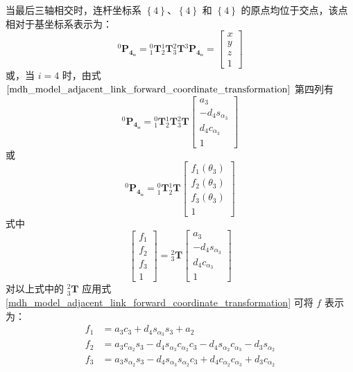 \documentclass[cn,11pt,chinese,blue,bibstyle=ieeetr]{elegantbook}
\begin{document}
当最后三轴相交时，连杆坐标系 $\left\{4\right\}$、$\left\{4\right\}$ 和 $\left\{4\right\}$ 的原点均位于交点，该点相对于基坐标系表示为：
\begin{equation}
{^0\bm{P_{4_o}}} = {_1^0\bm{T}}{_2^1\bm{T}}{_3^2\bm{T}}{^3\bm{P_{4_o}}} = \begin{bmatrix}
x \\
y \\
z \\
1
\end{bmatrix}
\end{equation}
或，当 $i=4$ 时，由式 $\ref{mdh_model_adjacent_link_forward_coordinate_transformation}$ 第四列有
\begin{equation}
	{^0\bm{P_{4_o}}} = {_1^0\bm{T}}{_2^1\bm{T}}{_3^2\bm{T}}\begin{bmatrix}
		a_3 \\
		-d_4s_{\alpha_3} \\
		d_4c_{\alpha_3} \\
		1
	\end{bmatrix}
\end{equation}
或
\begin{equation}
	{^0\bm{P_{4_o}}} = {_1^0\bm{T}}{_2^1\bm{T}}\begin{bmatrix}
		f_1\left(\theta_3\right) \\
		f_2\left(\theta_3\right) \\
		f_3\left(\theta_3\right) \\
		1
	\end{bmatrix}
\end{equation}
式中
\begin{equation}
\begin{bmatrix}
f_1 \\
f_2 \\
f_3 \\
1
\end{bmatrix} = {_3^2\bm{T}}\begin{bmatrix}
a_3 \\
-d_4s_{\alpha_3} \\
d_4c_{\alpha_3} \\
1
\end{bmatrix}
\end{equation}
对以上式中的 ${_3^2\bm{T}}$ 应用式 \ref{mdh_model_adjacent_link_forward_coordinate_transformation} 可将 $f$ 表示为：
\begin{equation}
\begin{aligned}
	f_1 &= a_3c_3 + d_4s_{\alpha_3}s_3 + a_2 \\
	f_2 &= a_3c_{\alpha_2}s_3 - d_4s_{\alpha_3}c_{\alpha_2}c_3 - d_4s_{\alpha_2}c_{\alpha_3} - d_3s_{\alpha_2} \\
	f_3 &= a_3s_{\alpha_2}s_3 - d_4s_{\alpha_3}s_{\alpha_2}c_3 + d_4c_{\alpha_2}c_{\alpha_3} + d_3c_{\alpha_2}
\end{aligned}
\end{equation}
\end{document}

